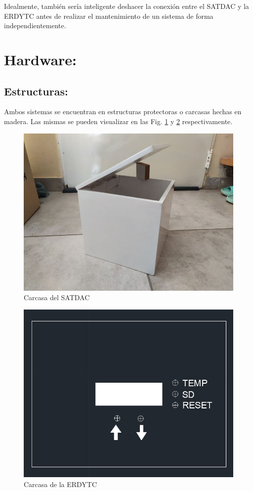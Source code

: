 \documentclass[conference]{IEEEtran}
\begin{document}
Idealmente, también sería inteligente deshacer la conexión entre el SATDAC y la ERDYTC antes de realizar el mantenimiento de un sistema de forma independientemente.
\section{Hardware:}
\label{sec:org8642ba7}
\subsection{Estructuras:}
\label{sec:orgfc3b044}
Ambos sistemas se encuentran en estructuras protectoras o carcasas hechas en madera. Las mismas se pueden visualizar en las Fig. \ref{fig:cuboFisico} y \ref{fig:estacionFisico} respectivamente.

\begin{figure}[htbp]
\centering
\includegraphics[width=.9\linewidth]{../../images/cuboFisico.png}
\caption{\label{fig:cuboFisico}Carcasa del SATDAC}
\end{figure}

\begin{figure}[htbp]
\centering
\includegraphics[width=.9\linewidth]{../../images/estacionFisico.png}
\caption{\label{fig:estacionFisico}Carcasa de la ERDYTC}
\end{figure}
\end{document}

